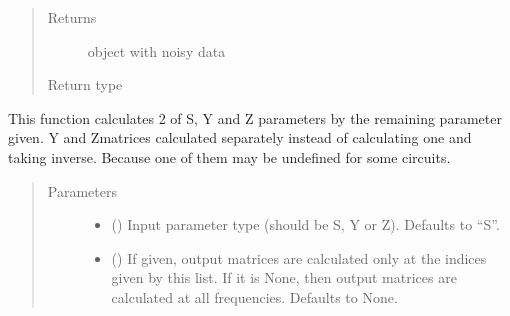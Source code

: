 \documentclass[letterpaper,10pt,english]{sphinxmanual}
\begin{document}
\begin{fulllineitems}
\begin{fulllineitems}
\begin{quote}
\begin{description}
\begin{itemize}
\end{itemize}

\item[{Returns}] \leavevmode
object with noisy data

\item[{Return type}] \leavevmode
{\hyperref[\detokenize{touchstone:touchstone.spfile}]{}}

\end{description}\end{quote}

\end{fulllineitems}


\begin{fulllineitems}
\label{\detokenize{touchstone:touchstone.spfile.calc_syz}}
This function calculates 2 of S, Y and Z parameters by the remaining parameter given.
Y and Z\sphinxhyphen{}matrices calculated separately instead of calculating one and taking inverse. Because one of them may be undefined for some circuits.
\begin{quote}\begin{description}
\item[{Parameters}] \leavevmode\begin{itemize}
\item {} 
 (\sphinxstyleliteralemphasis{\sphinxupquote{, }}) \textendash{} Input parameter type (should be S, Y or Z). Defaults to “S”.

\item {} 
 (\sphinxstyleliteralemphasis{\sphinxupquote{, }}) \textendash{} If given, output matrices are calculated only at the indices given by this list. If it is None, then output matrices are calculated at all frequencies. Defaults to None.

\end{itemize}


\end{description}
\end{quote}
\end{fulllineitems}
\end{fulllineitems}
\end{document}
